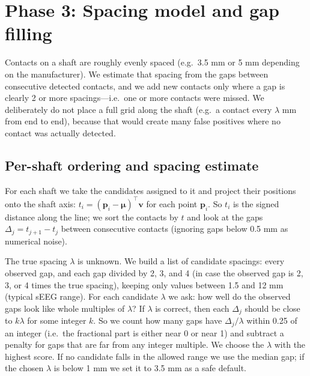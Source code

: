 \documentclass[11pt,a4paper]{article}
\newcommand{\vp}{\mathbf{p}}
\newcommand{\vm}{\boldsymbol{\mu}}
\newcommand{\vv}{\mathbf{v}}
\begin{document}
\section{Phase 3: Spacing model and gap filling}
\label{sec:phase3}

Contacts on a shaft are roughly evenly spaced (e.g.\ 3.5 mm or 5 mm depending on the manufacturer). We estimate that spacing from the gaps between consecutive detected contacts, and we add new contacts only where a gap is clearly 2 or more spacings---i.e.\ one or more contacts were missed. We deliberately do not place a full grid along the shaft (e.g.\ a contact every \(\lambda\) mm from end to end), because that would create many false positives where no contact was actually detected.

\subsection{Per-shaft ordering and spacing estimate}
For each shaft we take the candidates assigned to it and project their positions onto the shaft axis: \(t_i = (\vp_i - \vm)^\top \vv\) for each point \(\vp_i\). So \(t_i\) is the signed distance along the line; we sort the contacts by \(t\) and look at the gaps \(\Delta_j = t_{j+1} - t_j\) between consecutive contacts (ignoring gaps below 0.5 mm as numerical noise).

The true spacing \(\lambda\) is unknown. We build a list of candidate spacings: every observed gap, and each gap divided by 2, 3, and 4 (in case the observed gap is 2, 3, or 4 times the true spacing), keeping only values between 1.5 and 12 mm (typical sEEG range). For each candidate \(\lambda\) we ask: how well do the observed gaps look like whole multiples of \(\lambda\)? If \(\lambda\) is correct, then each \(\Delta_j\) should be close to \(k\lambda\) for some integer \(k\). So we count how many gaps have \(\Delta_j/\lambda\) within 0.25 of an integer (i.e.\ the fractional part is either near 0 or near 1) and subtract a penalty for gaps that are far from any integer multiple. We choose the \(\lambda\) with the highest score. If no candidate falls in the allowed range we use the median gap; if the chosen \(\lambda\) is below 1 mm we set it to 3.5 mm as a safe default.
\end{document}
